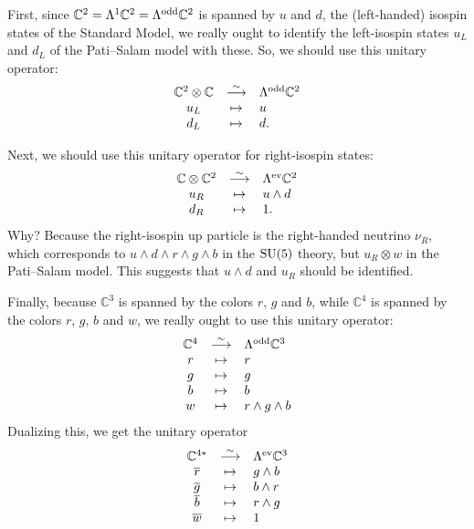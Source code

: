 \documentclass[12pt]{article}
\newcommand{\C}{{\mathbb C}}  %
\newcommand{\SU}{{\rm SU}}    %
\newcommand{\Ex}{\Lambda} %
\newcommand{\Exev}{\Lambda^{\rm ev}} %
\newcommand{\Exodd}{\Lambda^{\rm odd}} %
\begin{document}
First, since $\C^2 = \Ex^1 \C^2 = \Exodd \C^2$ is spanned by $u$ and
$d$, the (left-handed) isospin states of the Standard Model, we really ought
to identify the left-isospin states $u_L$ and $d_L$ of the Pati--Salam model
with these.  So, we should use this unitary operator:
\[          
\begin{array}{ccl}
 \C^2 \otimes \C & \stackrel{\sim}{\longrightarrow} &  \Exodd \C^2  \\
             u_L & \mapsto & u   \\
             d_L & \mapsto & d .
\end{array}
\]

Next, we should use this unitary operator for right-isospin states:
\[          
\begin{array}{ccl}
 \C \otimes \C^2 & \stackrel{\sim}{\longrightarrow} &  \Exev \C^2  \\
             u_R & \mapsto & u \wedge d   \\
             d_R & \mapsto & 1 .
\end{array}
\]
Why?  Because the right-isospin up particle is the right-handed neutrino 
$\nu_R$, which corresponds to $u \wedge d \wedge r \wedge g \wedge b$ 
in the $\SU(5)$ theory, but $u_R \otimes w$ 
in the Pati--Salam model.  This suggests that $u \wedge d$ and $u_R$
should be identified.

Finally, because $\C^3$ is spanned by the colors $r$, $g$ and $b$, while
$\C^4$ is spanned by the colors $r$, $g$, $b$ and $w$, we really ought
to use this unitary operator:
\[          
\begin{array}{ccl}
 \C^4 & \stackrel{\sim}{\longrightarrow} &  \Exodd \C^3  \\
    r & \mapsto & r \\ 
    g & \mapsto & g \\ 
    b & \mapsto & b \\ 
    w & \mapsto & r \wedge g \wedge b 
\end{array}
\]
Dualizing this, we get the unitary operator
\[          
\begin{array}{ccl}
 \C^{4*} & \stackrel{\sim}{\longrightarrow} &  \Exev \C^3  \\
    \overline{r} & \mapsto & g \wedge b \\ 
    \overline{g} & \mapsto & b \wedge r \\ 
    \overline{b} & \mapsto & r \wedge g \\ 
    \overline{w} & \mapsto & 1
\end{array}
\]
\end{document}
